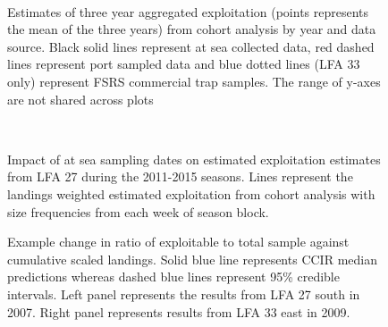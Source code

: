 \begin{figure}
        \centering
         \\
                    
                    \caption{Estimates of three year aggregated exploitation (points represents the mean of the three years) from cohort analysis by year and data source. Black solid lines represent at sea collected data, red dashed lines represent port sampled data and blue dotted lines (LFA 33 only) represent FSRS commercial trap samples. The range of y-axes are not shared across plots}
        \end{figure}


\begin{figure}
        \centering
         \\
                     \caption{Impact of at sea sampling dates on estimated exploitation estimates from LFA 27 during the 2011-2015 seasons. Lines represent the landings weighted estimated exploitation from cohort analysis with size frequencies from each week of season block.}
        \end{figure}


\begin{figure}
\centering
              \caption{Example change in ratio of exploitable to total sample against cumulative scaled landings. Solid blue line represents CCIR median predictions whereas dashed blue lines represent 95\% credible intervals. Left panel represents the results from LFA 27 south in 2007. Right panel represents results from LFA 33 east in 2009.}
\end{figure}


